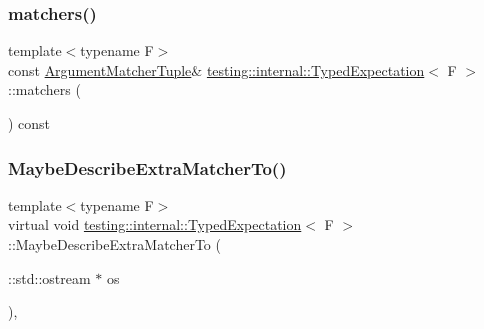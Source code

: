 \mbox{\label{classtesting_1_1internal_1_1_typed_expectation_ad1a18c39511a2f6fda425881cddcc31a}} 
\subsubsection{\texorpdfstring{matchers()}{matchers()}}
{\footnotesize\ttfamily template$<$typename F$>$ \\
const \hyperlink{classtesting_1_1internal_1_1_typed_expectation_a8f10e3906761cc5c10fa3561c6e8938e}{Argument\+Matcher\+Tuple}\& \hyperlink{classtesting_1_1internal_1_1_typed_expectation}{testing\+::internal\+::\+Typed\+Expectation}$<$ F $>$\+::matchers (\begin{DoxyParamCaption}{ }\end{DoxyParamCaption}) const\hspace{0.3cm}{\ttfamily [inline]}}

\mbox{\label{classtesting_1_1internal_1_1_typed_expectation_ab019251041a408dc5a5d8ae216be53f4}} 
\subsubsection{\texorpdfstring{Maybe\+Describe\+Extra\+Matcher\+To()}{MaybeDescribeExtraMatcherTo()}}
{\footnotesize\ttfamily template$<$typename F$>$ \\
virtual void \hyperlink{classtesting_1_1internal_1_1_typed_expectation}{testing\+::internal\+::\+Typed\+Expectation}$<$ F $>$\+::Maybe\+Describe\+Extra\+Matcher\+To (\begin{DoxyParamCaption}\item[{\+::std\+::ostream $\ast$}]{os }\end{DoxyParamCaption})\hspace{0.3cm}{\ttfamily [inline]}, {\ttfamily [virtual]}}



